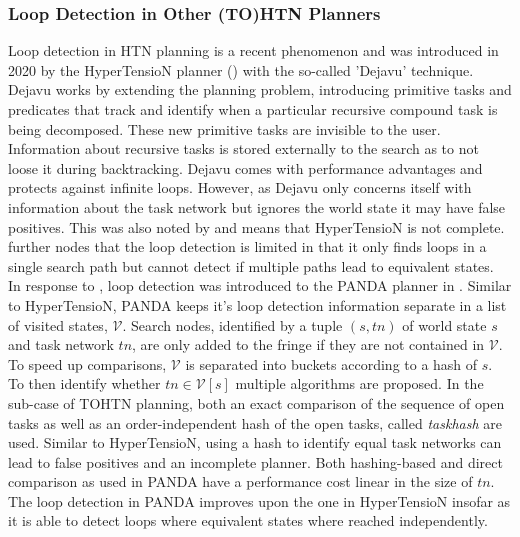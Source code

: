 \subsubsection{Loop Detection in Other (TO)HTN Planners}
\label{ld - history others}
Loop detection in HTN planning is a recent phenomenon and was introduced in 2020 by the HyperTensioN planner (\cite{magnaguagno2020hypertension}) with the so-called 'Dejavu' technique. Dejavu works by extending the planning problem, introducing primitive tasks and predicates that track and identify when a particular recursive compound task is being decomposed. These new primitive tasks are invisible to the user. Information about recursive tasks is stored externally to the search as to not loose it during backtracking. Dejavu comes with performance advantages and protects against infinite loops. However, as Dejavu only concerns itself with information about the task network but ignores the world state it may have false positives. This was also noted by \cite{holler2021loop} and means that HyperTensioN is not complete. \cite{holler2021loop} further nodes that the loop detection is limited in that it only finds loops in a single search path but cannot detect if multiple paths lead to equivalent states. \\
In response to \cite{magnaguagno2020hypertension}, loop detection was introduced to the PANDA planner in \cite{holler2021loop}. Similar to HyperTensioN, PANDA keeps it's loop detection information separate in a list of visited states, $\mathcal{V}$. Search nodes, identified by a tuple $(s, tn)$ of world state $s$ and task network $tn$, are only added to the fringe if they are not contained in $\mathcal{V}$. To speed up comparisons, $\mathcal{V}$ is separated into buckets according to a hash of $s$. To then identify whether $tn \in \mathcal{V}[s]$ multiple algorithms are proposed. In the sub-case of TOHTN planning, both an exact comparison of the sequence of open tasks as well as an order-independent hash of the open tasks, called \textit{taskhash} are used. Similar to HyperTensioN, using a hash to identify equal task networks can lead to false positives and an incomplete planner. Both hashing-based and direct comparison as used in PANDA have a performance cost linear in the size of $tn$. The loop detection in PANDA improves upon the one in HyperTensioN insofar as it is able to detect loops where equivalent states where reached independently.
